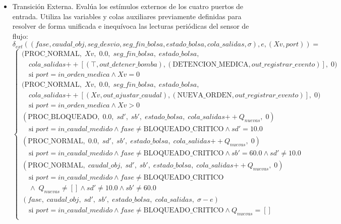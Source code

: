 \begin{itemize}
    \item Transición Externa. Evalúa los estímulos externos de los cuatro puertos de entrada. Utiliza las variables y colas auxiliares previamente definidas para resolver de forma unificada e inequívoca las lecturas periódicas del sensor de flujo:
    \[
    \delta_{ext}((fase, caudal\_obj, seg\_desvio, seg\_fin\_bolsa, estado\_bolsa, cola\_salidas, \sigma), e, (Xv, port)) =
    \]
    \[
    \begin{cases}
    (\text{PROC\_NORMAL},\; Xv,\; 0.0,\; seg\_fin\_bolsa,\; estado\_bolsa,\; \\
    \quad cola\_salidas \mathbin{++} [(\top, out\_detener\_bomba), (\text{DETENCION\_MEDICA}, out\_registrar\_evento)],\; 0) \\
    \quad \text{si } port = in\_orden\_medica \land Xv = 0 \\[2ex]
    (\text{PROC\_NORMAL},\; Xv,\; 0.0,\; seg\_fin\_bolsa,\; estado\_bolsa,\; \\
    \quad cola\_salidas \mathbin{++} [(Xv, out\_ajustar\_caudal), (\text{NUEVA\_ORDEN}, out\_registrar\_evento)],\; 0) \\
    \quad \text{si } port = in\_orden\_medica \land Xv > 0 \\[2ex]
    (\text{PROC\_BLOQUEADO},\; 0.0,\; sd',\; sb',\; estado\_bolsa,\; cola\_salidas \mathbin{++} Q_{nuevas},\; 0) \\
    \quad \text{si } port = in\_caudal\_medido \land fase \neq \text{BLOQUEADO\_CRITICO} \land sd' = 10.0 \\[2ex]
    (\text{PROC\_NORMAL},\; 0.0,\; sd',\; sb',\; estado\_bolsa,\; cola\_salidas \mathbin{++} Q_{nuevas},\; 0) \\
    \quad \text{si } port = in\_caudal\_medido \land fase \neq \text{BLOQUEADO\_CRITICO} \land sb' = 60.0 \land sd' \neq 10.0 \\[2ex]
    (\text{PROC\_NORMAL},\; caudal\_obj,\; sd',\; sb',\; estado\_bolsa,\; cola\_salidas \mathbin{++} Q_{nuevas},\; 0) \\
    \quad \text{si } port = in\_caudal\_medido \land fase \neq \text{BLOQUEADO\_CRITICO} \\
    \quad \land\; Q_{nuevas} \neq [ ] \land sd' \neq 10.0 \land sb' \neq 60.0 \\[2ex]
      (fase,\; caudal\_obj,\; sd',\; sb',\; estado\_bolsa,\; cola\_salidas,\; \sigma - e) \\
    \quad \text{si } port = in\_caudal\_medido \land fase \neq \text{BLOQUEADO\_CRITICO} \land Q_{nuevas} = [ ] \\[2ex]

\end{cases}\]
\end{itemize}
